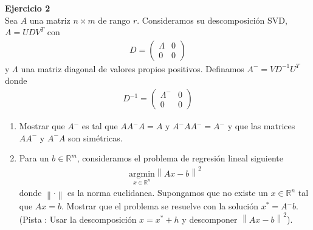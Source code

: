 \documentclass[a4paper, 11pt]{article}
\newenvironment{problem}[2][Ejercicio]
{ \begin{mdframed}[backgroundcolor= red!50] \textbf{#1 #2} \\}
	{  \end{mdframed}}
\begin{document}
	
\begin{problem}{2}
    Sea $A$ una matriz $n\times m$ de rango $r$. Consideramos su descomposición SVD, $A = UDV^T$ con 
    \begin{align*}
        D = \begin{pmatrix}
        \Lambda &0 \\
        0 &0 
        \end{pmatrix}
    \end{align*}
    y $\Lambda$ una matriz diagonal de valores propios positivos. Definamos $A^{-} = V D^{-1}U^T$ donde 
    \begin{align*}
        D^{-1} = \begin{pmatrix}
        \Lambda^{-} &0 \\
        0 &0 
        \end{pmatrix}
    \end{align*}
    \begin{enumerate}
        \item Mostrar que $A^-$ es tal que $A A^{-}A = A $ y $A^{-} A A^{-} = A^{-}$ y que las matrices $AA^{-}$ y $A^{-}A$ son simétricas.
        \item Para un $b \in \mathbb{R}^m$, consideramos el problema de regresión lineal siguiente 
        \begin{align*}
            \underset{x \in \mathbb{R}^n}{\text{argmin}}\left \| Ax - b \right \|^2
        \end{align*}
        donde $\left \| \cdot \right \|$ es la norma euclidanea. Supongamos que no existe un $x\in \mathbb{R}^n$ tal que $Ax = b$. Mostrar que el problema se resuelve con la solución $x^{*} = A^{-}b$. (Pista : Usar la descomposición $x = x^{*} + h$ y descomponer $\left \| Ax - b \right \|^2$). 
    \end{enumerate}
\end{problem}
\end{document}
